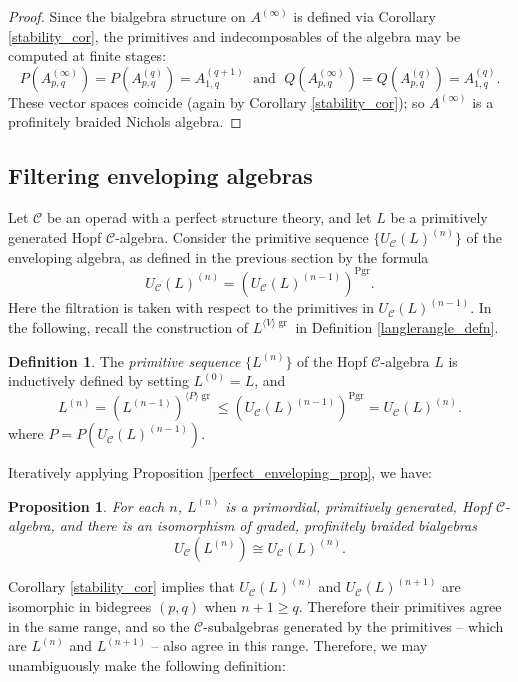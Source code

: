 \documentclass[12pt]{article}
\DeclareMathOperator{\Pgr}{Pgr}
\DeclareMathOperator{\gr}{gr}
\newcommand{\CC} {\mathcal{C}}
\newcommand{\beqn}{\begin{equation}}
\newcommand{\eeqn}{\end{equation}}
\theoremstyle{plain}
\newtheorem{prop}[thm]{Proposition}
\theoremstyle{definition}
\newtheorem{defn}[thm]{Definition}
\theoremstyle{remark}
\begin{document}
\begin{proof}

Since the bialgebra structure on $A^{(\infty)}$ is defined via Corollary \ref{stability_cor}, the primitives and indecomposables of the algebra may be computed at finite stages:
%
$$P(A^{(\infty)}_{p, q}) = P(A^{(q)}_{p, q}) = A^{(q+1)}_{1, q} \; \mbox{ and } \; Q(A^{(\infty)}_{p, q}) = Q(A^{(q)}_{p, q}) = A^{(q)}_{1, q}.$$
%
These vector spaces coincide (again by Corollary \ref{stability_cor}); so $A^{(\infty)}$ is a profinitely braided Nichols algebra. 

\end{proof}

\subsection{Filtering enveloping algebras} \label{filt_env_sec} 

Let $\CC$ be an operad with a perfect structure theory, and let $L$ be a primitively generated Hopf $\CC$-algebra.  Consider the primitive sequence $\{U_{\CC}(L)^{(n)}\}$ of the enveloping algebra, as defined in the previous section by the formula
%
$$U_{\CC}(L)^{(n)} =(U_{\CC}(L)^{(n-1)})^{\Pgr}.$$  
%
Here the filtration is taken with respect to the primitives in $U_{\CC}(L)^{(n-1)}$.  In the following, recall the construction of $L^{\langle V \rangle \gr}$ in Definition \ref{langlerangle_defn}.

\begin{defn}

The \emph{primitive sequence} $\{L^{(n)}\}$ of the Hopf $\CC$-algebra $L$ is inductively defined by setting $L^{(0)} = L$, and 
%
$$L^{(n)} = (L^{(n-1)})^{\langle P \rangle \gr} \leq (U_{\CC}(L)^{(n-1)})^{\Pgr} = U_{\CC}(L)^{(n)}.$$
%
where $P = P(U_{\CC}(L)^{(n-1)})$.

\end{defn}

Iteratively applying Proposition \ref{perfect_enveloping_prop}, we have:

\begin{prop}

For each $n$, $L^{(n)}$ is a primordial, primitively generated, Hopf $\CC$-algebra, and there is an isomorphism of graded, profinitely braided bialgebras
%
\beqn U_{\CC}(L^{(n)}) \cong U_{\CC}(L)^{(n)}. \label{iter_U_eqn} \eeqn  

\end{prop}

Corollary \ref{stability_cor} implies that $U_{\CC}(L)^{(n)}$ and $U_{\CC}(L)^{(n+1)}$ are isomorphic in bidegrees $(p,q)$ when $n+1 \geq q$.  Therefore their primitives agree in the same range, and so the $\CC$-subalgebras generated by the primitives -- which are $L^{(n)}$ and $L^{(n+1)}$ -- also agree in this range.  Therefore, we may unambiguously make the following definition:
\end{document}
